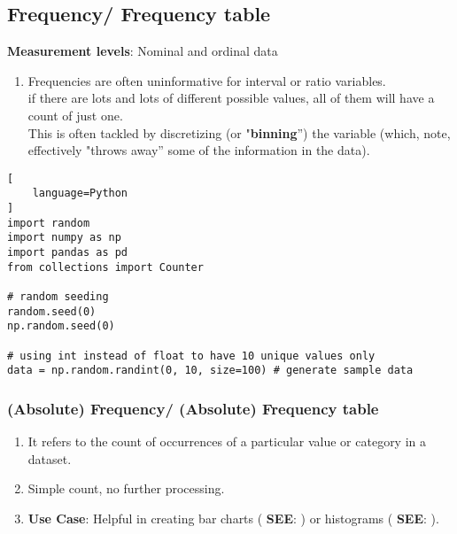 \subsection{Frequency/ Frequency table \cite{statistics/book/Statistics-for-Data-Scientists/Maurits-Kaptein}}\label{Data/Describing Data/Frequency or Frequency table}

\textbf{Measurement levels}: Nominal and ordinal data \hfill \cite{statistics/book/Statistics-for-Data-Scientists/Maurits-Kaptein}

\vspace{0.3cm}

\begin{enumerate}
    \item Frequencies are often uninformative for interval or ratio variables. \hfill \cite{statistics/book/Statistics-for-Data-Scientists/Maurits-Kaptein}\\
    if there are lots and lots of different possible values, all of them will have a count of just one. \hfill \cite{statistics/book/Statistics-for-Data-Scientists/Maurits-Kaptein}\\
    This is often tackled by discretizing (or "\textbf{binning}”\label{Data/Describing Data/Frequency or Frequency table/binning}) the variable (which, note, effectively "throws away” some of the information in the data). \hfill \cite{statistics/book/Statistics-for-Data-Scientists/Maurits-Kaptein}


\end{enumerate}


\begin{lstlisting}[
    language=Python
]
import random
import numpy as np
import pandas as pd
from collections import Counter

# random seeding
random.seed(0)
np.random.seed(0)

# using int instead of float to have 10 unique values only
data = np.random.randint(0, 10, size=100) # generate sample data
\end{lstlisting}


\subsubsection{(Absolute) Frequency/ (Absolute) Frequency table \cite{statistics/book/Statistics-for-Data-Scientists/Maurits-Kaptein}}\label{Data/Describing Data/Frequency or Frequency table/Absolute}

\begin{enumerate}
    \item It refers to the count of occurrences of a particular value or category in a dataset. \hfill \cite{common/online/chatgpt}

    \item Simple count, no further processing. \hfill \cite{common/online/chatgpt}

    \item \textbf{Use Case}: Helpful in creating bar charts ( \textbf{SEE}:  ) or histograms ( \textbf{SEE}:  ). \hfill \cite{common/online/chatgpt}
\end{enumerate}


